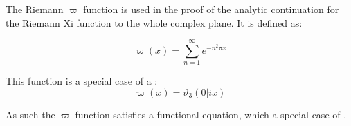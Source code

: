 \documentclass[12pt]{article}
\begin{document}
The Riemann $\varpi$ function is used in the proof of the analytic continuation for the Riemann Xi function to the whole complex plane. It is defined as:

\[
\varpi(x) = \sum_{n=1}^{\infty} e^{-n^2 \pi x}
\]

This function is a special case of a :
\[
\varpi (x) = \vartheta_3 ( 0 | i x)
\]

As such the $\varpi$ function satisfies a functional equation, which a special case of .
\end{document}
